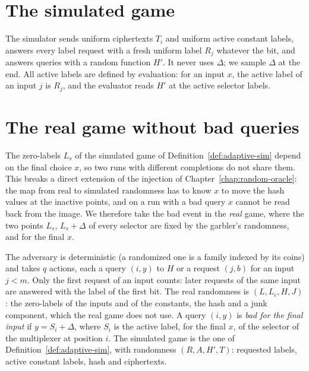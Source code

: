 \section{The simulated game}

\begin{definition}
  \label{def:adaptive-sim}
  \leanok
  The simulator sends uniform ciphertexts $T_i$ and uniform active constant labels, answers every
  label request with a fresh uniform label $R_j$ whatever the bit, and answers queries with a
  random function $H'$. It never uses $\Delta$; we sample $\Delta$ at the end. All active labels
  are defined by evaluation: for an input $x$, the active label of an input $j$ is $R_j$, and the
  evaluator reads $H'$ at the active selector labels.
\end{definition}

\section{The real game without bad queries}
\label{sec:adaptive-lean}

The zero-labels $L_s$ of the simulated game of Definition~\ref{def:adaptive-sim} depend on the final
choice $x$, so two runs with different completions do not share them. This breaks a direct extension
of the injection of Chapter~\ref{chap:random-oracle}: the map from real to simulated randomness has
to know $x$ to move the hash values at the inactive points, and on a run with a bad query $x$ cannot
be read back from the image. We therefore take the bad event in the \emph{real} game, where the two
points $L_s$, $L_s + \Delta$ of every selector are fixed by the garbler's randomness, and for the
final $x$.

\begin{definition}
  \label{def:adaptive-lean}
  \leanok
  The adversary is deterministic (a randomized one is a family indexed by its coins) and takes $q$
  actions, each a query $(i, y)$ to $H$ or a request $(j, b)$ for an input $j < m$. Only the first
  request of an input counts: later requests of the same input are answered with the label of the
  first bit. The real randomness is $(L, L_c, H, J)$: the zero-labels of the inputs and of the
  constants, the hash and a junk component, which the real game does not use. A query $(i, y)$ is
  \emph{bad for the final input} if $y = S_i + \Delta$, where $S_i$ is the active label, for the
  final $x$, of the selector of the multiplexer at position $i$. The simulated game is the one of
  Definition~\ref{def:adaptive-sim}, with randomness $(R, A, H', T)$: requested labels, active
  constant labels, hash and ciphertexts.
\end{definition}

